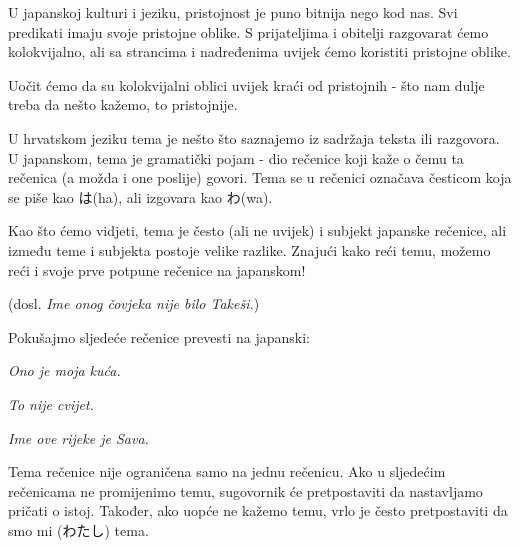 	
	U japanskoj kulturi i jeziku, pristojnost je puno bitnija nego kod nas. Svi predikati imaju svoje pristojne oblike. S prijateljima i obitelji razgovarat ćemo kolokvijalno, ali sa strancima i nadređenima uvijek ćemo koristiti pristojne oblike.
	
	Uočit ćemo da su kolokvijalni oblici uvijek kraći od pristojnih - što nam dulje treba da nešto kažemo, to pristojnije.
	
	
	U hrvatskom jeziku tema je nešto što saznajemo iz sadržaja teksta ili razgovora. U japanskom, tema je gramatički pojam - dio rečenice koji kaže o čemu ta rečenica (a možda i one poslije) govori. Tema se u rečenici označava česticom koja se piše kao は(ha), ali izgovara kao わ(wa)\footnotemark[3].
	
	
	Kao što ćemo vidjeti, tema je često (ali ne uvijek) i subjekt japanske rečenice, ali između teme i subjekta postoje velike razlike. Znajući kako reći temu, možemo reći i svoje prve potpune rečenice na japanskom!
	
	\begin{reibun}
		 (dosl. \textit{Ime onog čovjeka nije bilo Takeši.})
	\end{reibun}

	\begin{mondai}{Pokušajmo sljedeće rečenice prevesti na japanski:}
		\item \textit{Ono je moja kuća.}
		\item \textit{To nije cvijet.}
		\item \textit{Ime ove rijeke je Sava.}
	\end{mondai}

	Tema rečenice nije ograničena samo na jednu rečenicu. Ako u sljedećim rečenicama ne promijenimo temu, sugovornik će pretpostaviti da nastavljamo pričati o istoj. Također, ako uopće ne kažemo temu, vrlo je često pretpostaviti da smo mi (わたし) tema.

